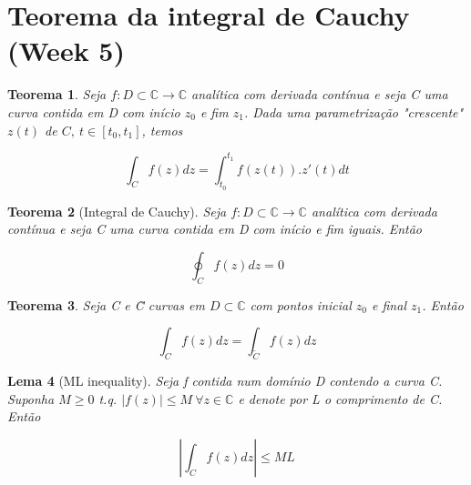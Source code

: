 \documentclass{article}
\newtheorem{theorem}{Teorema}
\newtheorem{lemma}[theorem]{Lema}
\begin{document}
\section*{Teorema da integral de Cauchy (Week 5)}
\label{s5}
\begin{theorem}
Seja $f: D \subset \mathbb{C} \to \mathbb{C}$ analítica com derivada contínua e seja C uma curva contida em D com início $z_0$ e fim $z_1$. Dada uma parametrização "crescente" $z(t)$ de $C,\ t \in [t_0, t_1]$, temos

$$\int_C f(z) d z = \int_{t_0}^{t_1} f(z(t)) . z'(t) d t$$
\end{theorem}

\begin{theorem}[Integral de Cauchy]
Seja $f: D \subset \mathbb{C} \to \mathbb{C}$ analítica com derivada contínua e seja C uma curva contida em D com início e fim iguais. Então

$$\oint_C f(z) d z = 0$$
\end{theorem}

\begin{theorem}
Seja C e \~C curvas em $D \subset \mathbb{C}$ com pontos inicial $z_0$ e final $z_1$. Então

$$\int_C f(z) d z = \int_{\tilde{C}} f(z) d z$$
\end{theorem}

\begin{lemma}[ML inequality]
Seja f contida num domínio D contendo a curva C. Suponha $M \geq 0$ t.q. $| f(z) | \leq M\ \forall z \in \mathbb{C}$ e denote por L o comprimento de C. Então

$$\left | \int_C f(z) d z \right | \leq M L$$
\end{lemma}

%
\end{document}
